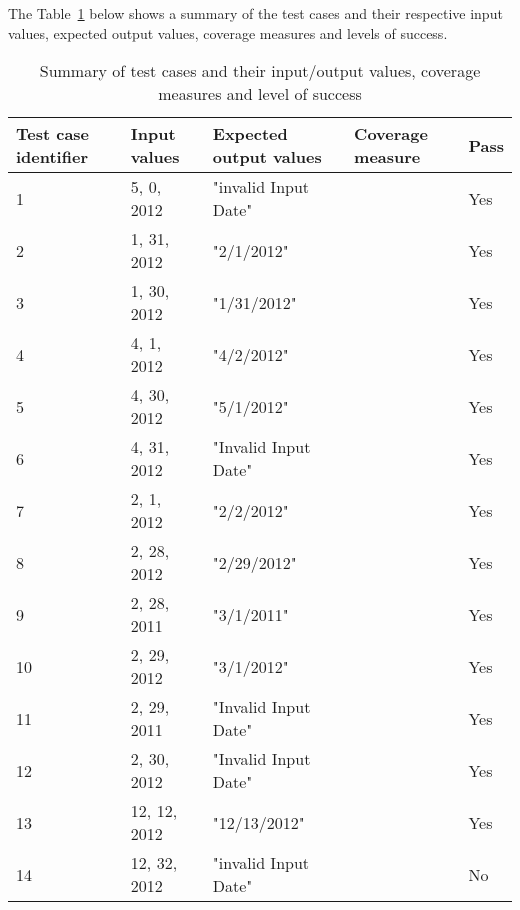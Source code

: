 
\noindent The Table~\ref{testinputtable} below shows a summary of the test cases and their respective input values, expected output values, coverage measures and levels of success. 

\begin{table}[htb]
	\centering
	\caption{Summary of test cases and their input/output values, coverage measures and level of success}
	\label{testinputtable}
	
    \begin{tabular}{|l|l|l|l|l|}
        \hline
        Test case identifier & Input values & Expected output values & Coverage measure & Pass \\ \hline
        1                    & 5, 0, 2012   & "invalid Input Date"   & ~                & Yes  \\ 
        2                    & 1, 31, 2012  & "2/1/2012"             & ~                & Yes  \\ 
        3                    & 1, 30, 2012  & "1/31/2012"            & ~                & Yes  \\ 
        4                    & 4, 1, 2012   & "4/2/2012"             & ~                & Yes  \\ 
        5                    & 4, 30, 2012  & "5/1/2012"             & ~                & Yes  \\ 
        6                    & 4, 31, 2012  & "Invalid Input Date"   & ~                & Yes  \\ 
        7                    & 2, 1, 2012   & "2/2/2012"             & ~                & Yes  \\ 
        8                    & 2, 28, 2012  & "2/29/2012"            & ~                & Yes  \\ 
        9                    & 2, 28, 2011  & "3/1/2011"             & ~                & Yes  \\ 
        10                   & 2, 29, 2012  & "3/1/2012"             & ~                & Yes  \\ 
        11                   & 2, 29, 2011  & "Invalid Input Date"   & ~                & Yes  \\ 
        12                   & 2, 30, 2012  & "Invalid Input Date"   & ~                & Yes  \\ 
        13                   & 12, 12, 2012 & "12/13/2012"           & ~                & Yes  \\ 
        14                   & 12, 32, 2012 & "invalid Input Date"   & ~                & No   \\ 

\end{tabular}
\end{table}
